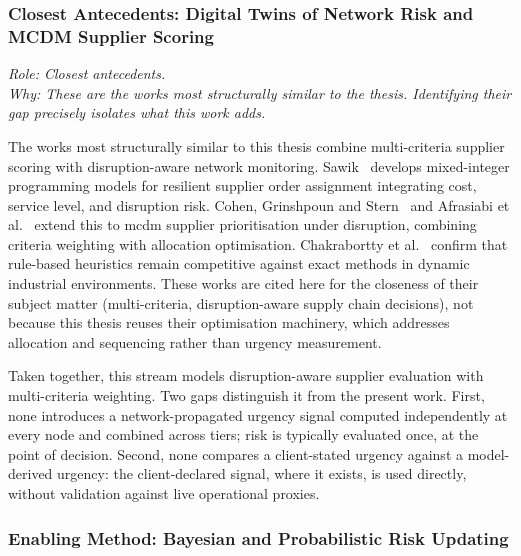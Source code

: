 \subsubsection{Closest Antecedents: Digital Twins of Network Risk and MCDM Supplier Scoring}
\label{subsec:antecedents}

\noindent\textit{Role: Closest antecedents. \\ Why: These are the works most structurally
similar to the thesis. Identifying their gap precisely isolates what this work adds.}

\medskip

The works most structurally similar to this thesis combine multi-criteria supplier
scoring with disruption-aware network monitoring.
Sawik~\autocite{sawik2013integrated,sawik2014joint,sawik2016integrated} develops
mixed-integer programming models for resilient supplier order assignment integrating
cost, service level, and disruption risk. Cohen, Grinshpoun and Stern~\autocite{cohen2021assigning}
and Afrasiabi et al.~\autocite{afrasiabi2022extended} extend this to \gls{mcdm}
supplier prioritisation under disruption, combining criteria weighting with allocation
optimisation. Chakrabortty et al.~\autocite{chakrabortty2020efficient} confirm that
rule-based heuristics remain competitive against exact methods in dynamic
industrial environments. These works are cited here for the closeness of their subject
matter (multi-criteria, disruption-aware supply chain decisions), not because this
thesis reuses their optimisation machinery, which addresses allocation and sequencing
rather than urgency measurement.

Taken together, this stream models disruption-aware supplier evaluation with
multi-criteria weighting. Two gaps distinguish it from the present work. First, none
introduces a network-propagated urgency signal computed independently at every node
and combined across tiers; risk is typically evaluated once, at the point of decision.
Second, none compares a client-stated urgency against a model-derived urgency: the
client-declared signal, where it exists, is used directly, without validation against
live operational proxies.


\subsubsection{Enabling Method: Bayesian and Probabilistic Risk Updating}
\label{subsec:bayesian}

